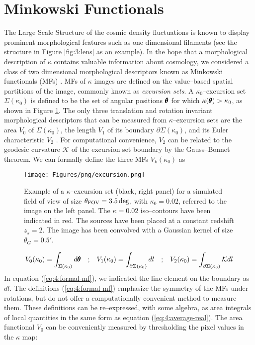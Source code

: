 
\section{Minkowski Functionals}
\label{sec:4:mink}
The Large Scale Structure of the cosmic density fluctuations is known to display prominent morphological features such as one dimensional filaments (see the structure in Figure \ref{fig:3:lens} as an example). In the hope that a morphological description of $\kappa$ contains valuable information about cosmology, we considered a class of two dimensional morphological descriptors known as Minkowski functionals (MFs) \citep{Tomita,MatsubaraLong,PetriMink,MinkJan,MinkShirasaki}. MFs of $\kappa$ images are defined on the value--based spatial partitions of the image, commonly known as \textit{excursion sets}. A $\kappa_0$--excursion set $\Sigma(\kappa_0)$ is defined to be the set of angular positions $\pmb{\theta}$ for which $\kappa(\pmb{\theta})>\kappa_0$, as shown in Figure \ref{fig:4:excursion}. The only three translation and rotation invariant morphological descriptors that can be measured from $\kappa$--excursion sets are the area $V_0$ of $\Sigma(\kappa_0)$, the length $V_1$ of its boundary $\partial\Sigma(\kappa_0)$, and its Euler characteristic $V_2$ \citep{MatsubaraLong}. For computational convenience, $V_2$ can be related to the geodesic curvature $\mathcal{K}$ of the excursion set boundary by the Gauss--Bonnet theorem. We can formally define the three MFs $V_k(\kappa_0)$ as 
%
\begin{figure}
\begin{center}
\texttt{[image: Figures/png/excursion.png]}
\end{center}
\caption{Example of a $\kappa$--excursion set (black, right panel) for a simulated field of view of size $\theta_{\rm FOV}=3.5\,{\rm deg}$, with $\kappa_0=0.02$, referred to the image on the left panel. The $\kappa=0.02$ iso--contours have been indicated in red. The sources have been placed at a constant redshift $z_s=2$. The image has been convolved with a Gaussian kernel of size $\theta_G=0.5'$.}
\label{fig:4:excursion}
\end{figure}
%
\begin{equation}
\label{eq:4:formal-mf}
\begin{matrix}
\displaystyle V_0(\kappa_0) = \int_{\Sigma(\kappa_0)} d\pmb{\theta} & ; & \displaystyle V_1(\kappa_0) = \int_{\partial\Sigma(\kappa_0)} dl & ; & \displaystyle V_2(\kappa_0) = \int_{\partial\Sigma(\kappa_0)}\mathcal{K}dl
\end{matrix}
\end{equation}   
%
In equation (\ref{eq:4:formal-mf}), we indicated the line element on the boundary as $dl$. The definitions (\ref{eq:4:formal-mf}) emphasize the symmetry of the MFs under rotations, but do not offer a computationally convenient method to measure them. These definitions can be re--expressed, with some algebra, as area integrals of local quantities in the same form as equation (\ref{eq:4:average-real}). The area functional $V_0$ can be conveniently measured by thresholding the pixel values in the $\kappa$ map:

